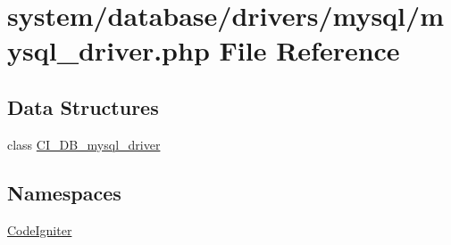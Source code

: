 \hypertarget{mysql__driver_8php}{}\section{system/database/drivers/mysql/mysql\+\_\+driver.php File Reference}
\label{mysql__driver_8php}
\subsection*{Data Structures}
\begin{DoxyCompactItemize}
\item 
class \mbox{\hyperlink{class_c_i___d_b__mysql__driver}{C\+I\+\_\+\+D\+B\+\_\+mysql\+\_\+driver}}
\end{DoxyCompactItemize}
\subsection*{Namespaces}
\begin{DoxyCompactItemize}
\item 
 \mbox{\hyperlink{namespace_code_igniter}{Code\+Igniter}}
\end{DoxyCompactItemize}
